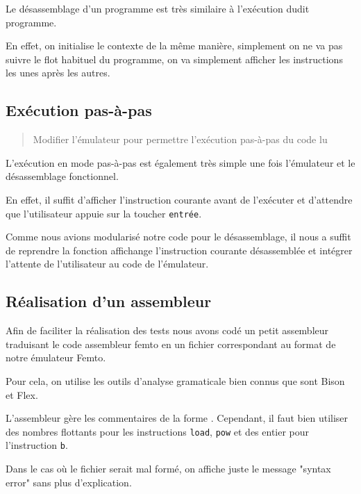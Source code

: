 \documentclass[11pt,a4paper]{article}
\begin{document}
Le désassemblage d'un programme est très similaire à l'exécution dudit programme.

En effet, on initialise le contexte de la même manière, simplement on ne va pas suivre le flot
habituel du programme, on va simplement afficher les instructions les unes après les autres.

\subsection{Exécution pas-à-pas}

\begin{quote}
Modifier l’émulateur pour permettre l’exécution pas-à-pas du code lu
\end{quote}

L'exécution en mode pas-à-pas est également très simple une fois l'émulateur et le désassemblage
fonctionnel.

En effet, il suffit d'afficher l'instruction courante avant de l'exécuter et d'attendre que
l'utilisateur appuie sur la toucher \texttt{entrée}.

Comme nous avions modularisé notre code pour le désassemblage, il nous a suffit de reprendre la
fonction affichange l'instruction courante désassemblée et intégrer l'attente de l'utilisateur au
code de l'émulateur.

\subsection{Réalisation d'un assembleur}

Afin de faciliter la réalisation des tests nous avons codé un petit assembleur traduisant le code
assembleur femto en un fichier correspondant au format de notre émulateur Femto.

Pour cela, on utilise les outils d'analyse gramaticale bien connus que sont Bison et Flex.

L'assembleur gère les commentaires de la forme \texttt{\/\/}. Cependant, il faut bien utiliser des
nombres flottants pour les instructions \texttt{load}, \texttt{pow} et des entier pour l'instruction
\texttt{b}.

Dans le cas où le fichier serait mal formé, on affiche juste le message "syntax error" sans plus
d'explication.
\end{document}
